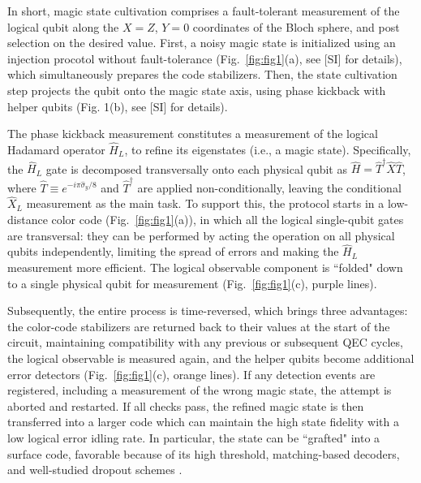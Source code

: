 \documentclass[%
 reprint,
 amsmath,amssymb,
 aps,
]{revtex4-2}
\begin{document}
In short, magic state cultivation comprises a fault-tolerant measurement of the logical qubit along the $X = Z$, $Y = 0$ coordinates of the Bloch sphere, and post selection on the desired value. First, a noisy magic state is initialized using an injection procotol without fault-tolerance (Fig.~\ref{fig:fig1}(a), see [SI] for details), which simultaneously prepares the code stabilizers. Then, the state cultivation step projects the qubit onto the magic state axis, using phase kickback with helper qubits (Fig. 1(b), see [SI] for details). 

The phase kickback measurement constitutes a measurement of the logical Hadamard operator $\hat{H}_L$, to refine its eigenstates (i.e., a magic state). Specifically, the $\hat{H}_L$ gate is decomposed transversally onto each physical qubit as $\hat{H} = \hat{T}^\dagger \hat{X} \hat{T}$, where $\hat{T} \equiv e^{-i \pi \hat{\sigma}_y / 8}$ and $\hat{T}^\dagger$ are applied non-conditionally, leaving the conditional $\hat{X}_L$ measurement as the main task. To support this, the protocol starts in a low-distance color code (Fig.~\ref{fig:fig1}(a)), in which all the logical single-qubit gates are transversal: they can be performed by acting the operation on all physical qubits independently, limiting the spread of errors and making the $\hat{H}_L$ measurement more efficient. The logical observable component is ``folded" down to a single physical qubit for measurement (Fig.~\ref{fig:fig1}(c), purple lines). 

Subsequently, the entire process is time-reversed, which brings three advantages: the color-code stabilizers are returned back to their values at the start of the circuit, maintaining compatibility with any previous or subsequent QEC cycles, the logical observable is measured again, and the helper qubits become additional error detectors (Fig.~\ref{fig:fig1}(c), orange lines). If any detection events are registered, including a measurement of the wrong magic state, the attempt is aborted and restarted. If all checks pass, the refined magic state is then transferred into a larger code which can maintain the high state fidelity with a low logical error idling rate. In particular, the state can be ``grafted" into a surface code, favorable because of its high threshold, matching-based decoders, and well-studied dropout schemes \cite{bravyi_universal_2005, acharya_quantum_2025, fowler_surface_2012, eickbusch_demonstration_2025, debroy_luci_2025}.
\end{document}
